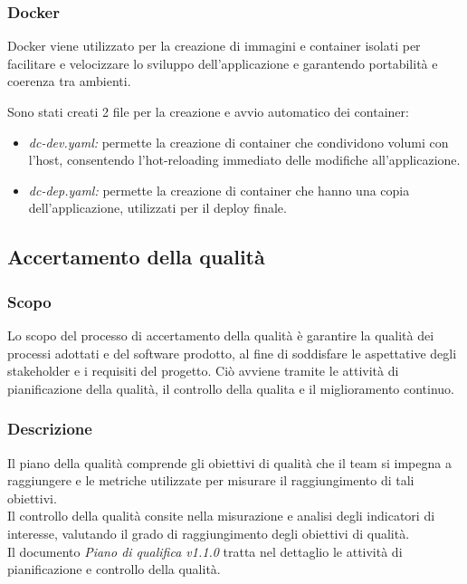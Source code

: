\subsubsection{Docker}
Docker viene utilizzato per la creazione di immagini e container isolati per facilitare e velocizzare lo sviluppo dell'applicazione e garantendo portabilità e coerenza tra ambienti.

Sono stati creati 2 file per la creazione e avvio automatico dei container:
\begin{itemize}
      \item \textit{dc-dev.yaml:} permette la creazione di container che condividono volumi con l'host, consentendo l'hot-reloading immediato delle modifiche all'applicazione.
      \item \textit{dc-dep.yaml:}  permette la creazione di container che hanno una copia dell'applicazione, utilizzati per il deploy finale.
\end{itemize}


\subsection{Accertamento della qualità}
\subsubsection{Scopo}
Lo scopo del processo di accertamento della qualità è garantire la qualità dei
processi adottati e del software prodotto, al fine di soddisfare le aspettative
degli stakeholder e i requisiti del progetto. Ciò avviene tramite le attività
di pianificazione della qualità, il controllo della qualita e il miglioramento
continuo.
\subsubsection{Descrizione}
Il piano della qualità comprende gli obiettivi di qualità che il team si
impegna a raggiungere e le metriche utilizzate per misurare il raggiungimento
di tali obiettivi. \\ Il controllo della qualità consite nella misurazione e
analisi degli indicatori di interesse, valutando il grado di raggiungimento
degli obiettivi di qualità. \\ Il documento \textit{Piano di qualifica v1.1.0} tratta
nel dettaglio le attività di pianificazione e controllo della qualità. \\

